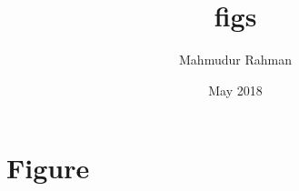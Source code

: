 \documentclass{article}
\title{figs}
\author{Mahmudur Rahman}
\date{May 2018}
\begin{document}
\maketitle

\section{Figure}

\end{document}
